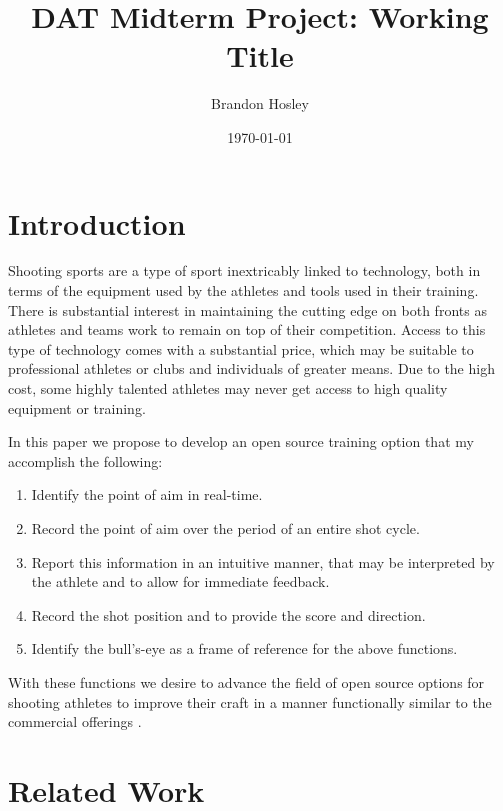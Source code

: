 \documentclass[conference]{IEEEtran}
\title{DAT Midterm Project: Working Title}
\author{Brandon Hosley}
\date{\today}
\begin{document}
	\maketitle
	
\begin{abstract}
\end{abstract}

\section{Introduction}

Shooting sports are a type of sport inextricably linked to technology, 
both in terms of the equipment used by the athletes and tools used in their training.
There is substantial interest in maintaining the cutting edge on both fronts as athletes and teams work to remain on top of their competition.
Access to this type of technology comes with a substantial price, which may be suitable to professional athletes or clubs and individuals of greater means.
Due to the high cost, some highly talented athletes may never get access to high quality equipment or training.

In this paper we propose to develop an open source training option that my accomplish the following:

\begin{enumerate}
	\item Identify the point of aim in real-time.
	\item Record the point of aim over the period of an entire shot cycle.
	\item Report this information in an intuitive manner, that may be interpreted by the athlete and to allow for immediate feedback.
	
	\item Record the shot position and to provide the score and direction.
	\item Identify the bull's-eye as a frame of reference for the above functions.
\end{enumerate}

With these functions we desire to advance the field of open source options for shooting athletes to improve their craft in a manner functionally similar to the commercial offerings \cite{scatt, noptel}.

\section{Related Work}
\end{document}
